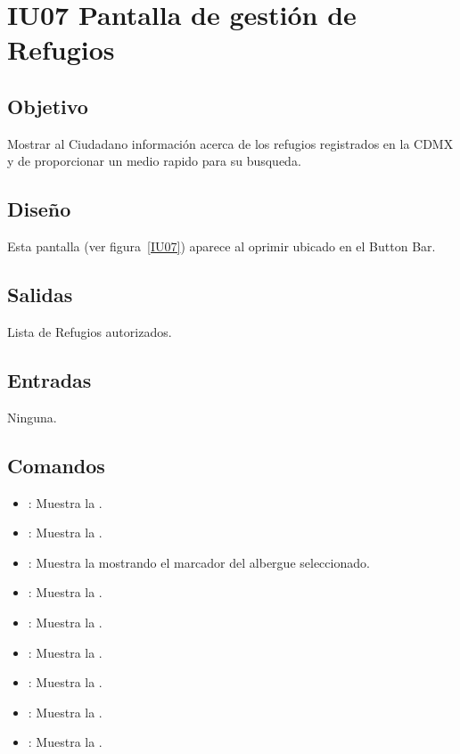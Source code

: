 \section{IU07 Pantalla de gestión de Refugios}

\subsection{Objetivo}
	Mostrar al Ciudadano información acerca de los refugios registrados en la CDMX y de proporcionar un medio rapido para su busqueda.

\subsection{Diseño}
	Esta pantalla  (ver figura~\ref{IU07}) aparece al oprimir  ubicado en el Button Bar.
	

\subsection{Salidas}

	Lista de Refugios autorizados.

\subsection{Entradas}
	Ninguna.

\subsection{Comandos}
\begin{itemize}
	\item {}: Muestra la .
	\item {}: Muestra la .
	\item {}: Muestra la  mostrando el marcador del albergue seleccionado.
	\item {}: Muestra la .
	\item {}: Muestra la .
	\item {}: Muestra la .
	\item {}: Muestra la .
	\item {}: Muestra la .
	\item {}: Muestra la .
\end{itemize}

